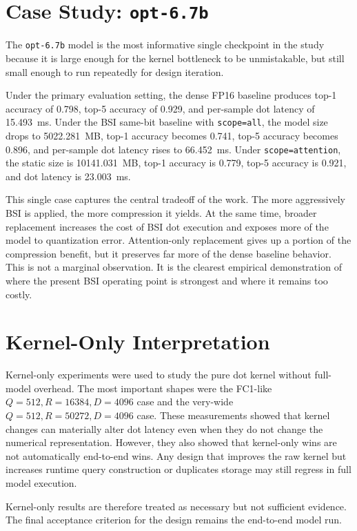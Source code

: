 \section{Case Study: \texttt{opt-6.7b}}
The \texttt{opt-6.7b} model is the most informative single checkpoint in the study because it is large enough for the kernel bottleneck to be unmistakable, but still small enough to run repeatedly for design iteration.

Under the primary evaluation setting, the dense FP16 baseline produces top-1 accuracy of 0.798, top-5 accuracy of 0.929, and per-sample dot latency of 15.493~ms. Under the BSI same-bit baseline with \texttt{scope=all}, the model size drops to 5022.281~MB, top-1 accuracy becomes 0.741, top-5 accuracy becomes 0.896, and per-sample dot latency rises to 66.452~ms. Under \texttt{scope=attention}, the static size is 10141.031~MB, top-1 accuracy is 0.779, top-5 accuracy is 0.921, and dot latency is 23.003~ms.

This single case captures the central tradeoff of the work. The more aggressively BSI is applied, the more compression it yields. At the same time, broader replacement increases the cost of BSI dot execution and exposes more of the model to quantization error. Attention-only replacement gives up a portion of the compression benefit, but it preserves far more of the dense baseline behavior. This is not a marginal observation. It is the clearest empirical demonstration of where the present BSI operating point is strongest and where it remains too costly.

\section{Kernel-Only Interpretation}
Kernel-only experiments were used to study the pure dot kernel without full-model overhead. The most important shapes were the FC1-like \(Q=512, R=16384, D=4096\) case and the very-wide \(Q=512, R=50272, D=4096\) case. These measurements showed that kernel changes can materially alter dot latency even when they do not change the numerical representation. However, they also showed that kernel-only wins are not automatically end-to-end wins. Any design that improves the raw kernel but increases runtime query construction or duplicates storage may still regress in full model execution.

Kernel-only results are therefore treated as necessary but not sufficient evidence. The final acceptance criterion for the design remains the end-to-end model run.

